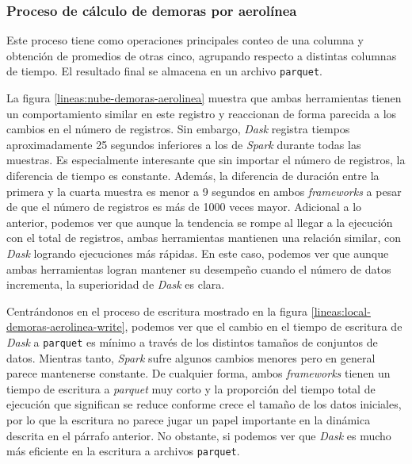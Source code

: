 \subsubsection{Proceso de cálculo de demoras por aerolínea}

Este proceso tiene como operaciones principales conteo de una columna y obtención de promedios de otras cinco, agrupando respecto a distintas columnas de tiempo. El resultado final se almacena en un archivo \texttt{parquet}.

La figura \ref{lineas:nube-demoras-aerolinea} muestra que ambas herramientas tienen un comportamiento similar en este registro y reaccionan de forma parecida a los cambios en el número de registros. Sin embargo, \textit{Dask} registra tiempos aproximadamente 25 segundos inferiores a los de \textit{Spark} durante todas las muestras. Es especialmente interesante que sin importar el número de registros, la diferencia de tiempo es constante. Además, la diferencia de duración entre la primera y la cuarta muestra es menor a 9 segundos en ambos \textit{frameworks} a pesar de que el número de registros es más de 1000 veces mayor. Adicional a lo anterior, podemos ver que aunque la tendencia se rompe al llegar a la ejecución con el total de registros, ambas herramientas mantienen una relación similar, con \textit{Dask} logrando ejecuciones más rápidas. En este caso, podemos ver que aunque ambas herramientas logran mantener su desempeño cuando el número de datos incrementa, la superioridad de \textit{Dask} es clara.

Centrándonos en el proceso de escritura mostrado en la figura \ref{lineas:local-demoras-aerolinea-write}, podemos ver que el cambio en el tiempo de escritura de \textit{Dask} a \texttt{parquet} es mínimo a través de los distintos tamaños de conjuntos de datos. Mientras tanto, \textit{Spark} sufre algunos cambios menores pero en general parece mantenerse constante. De cualquier forma, ambos \textit{frameworks} tienen un tiempo de escritura a \textit{parquet} muy corto y la proporción del tiempo total de ejecución que significan se reduce conforme crece el tamaño de los datos iniciales, por lo que la escritura no parece jugar un papel importante en la dinámica descrita en el párrafo anterior. No obstante, si podemos ver que \textit{Dask} es mucho más eficiente en la escritura a archivos \texttt{parquet}.

